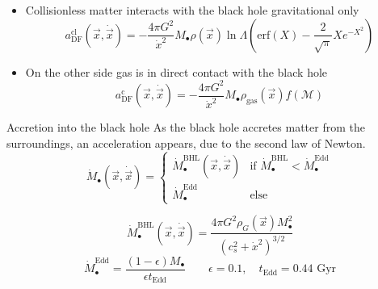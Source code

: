 \documentclass{beamer}
\newcommand{\erf}[1]{\text{erf}\left(#1\right)}
\begin{document}
\begin{frame}%
	\begin{itemize}
		\item Collisionless matter interacts with the black hole gravitational only
		\begin{equation}\label{eq: df_cl}
		a_\text{DF}^\text{cl}(\vec{x}, \dot{\vec{x}}) = -\dfrac{4\pi G^2}{\dot{x}^2} M_\bullet\rho(\vec{x})\ln\Lambda\left(\erf{X} - \dfrac{2}{\sqrt{\pi}}Xe^{-X^2}\right)
		\end{equation}
		
		\item On the other side gas is in direct contact with the black hole
		\begin{equation}\label{eq: df_c}
		a^\text{c}_\text{DF}(\vec{x}, \dot{\vec{x}}) = -\dfrac{4\pi G^2}{\dot{x}^2}M_\bullet\rho_\text{gas}(\vec{x})f(\mathcal{M})
		\end{equation}
		
	\end{itemize}
	
	
	
\end{frame}

\begin{frame}{Accretion into the black hole}
	As the black hole accretes matter from the surroundings, an acceleration appears, due to the second law of Newton.
	\begin{equation}
		\dot{M}_\bullet(\vec{x}, \dot{\vec{x}}) = \left\{
		\begin{array}{lc}
		\dot{M}_\bullet^\text{BHL}(\vec{x}, \dot{\vec{x}}) & \text{if $\dot{M}_\bullet^\text{BHL} < \dot{M}_\bullet^\text{Edd}$} \\
		\dot{M}_\bullet^\text{Edd} & \text{else}
		\end{array}
		\right.
	\end{equation}
	
	\begin{equation}
		\dot{M}_\bullet^\text{BHL}(\vec{x}, \dot{\vec{x}}) = \dfrac{4\pi G^2 \rho_G(\vec{x})M^2_\bullet}{\left(c_s^2 + \dot{x}^2\right)^{3/2}} %
	\end{equation}
	\begin{equation}
		\dot{M}_\bullet^\text{Edd} = \dfrac{(1 - \epsilon)M_\bullet}{\epsilon t_\text{Edd}} \qquad \epsilon = 0.1, \quad t_\text{Edd} = 0.44 \text{ Gyr}
	\end{equation}
\end{frame}
\end{document}

